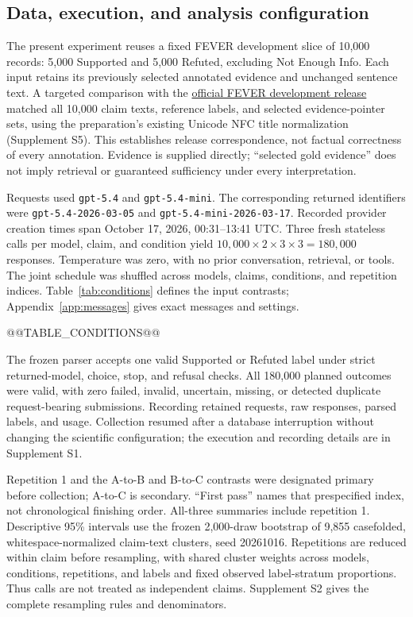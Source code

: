 \documentclass[11pt,letterpaper]{article}
\begin{document}
\subsection{Data, execution, and analysis configuration}\label{sec:setup}
The present experiment reuses a fixed FEVER development slice of 10,000 records: 5,000 Supported and 5,000 Refuted, excluding Not Enough Info. Each input retains its previously selected annotated evidence and unchanged sentence text. A targeted comparison with the \href{https://fever.ai/download/fever/shared_task_dev.jsonl}{official FEVER development release} matched all 10,000 claim texts, reference labels, and selected evidence-pointer sets, using the preparation's existing Unicode NFC title normalization (Supplement S5). This establishes release correspondence, not factual correctness of every annotation. Evidence is supplied directly; ``selected gold evidence'' does not imply retrieval or guaranteed sufficiency under every interpretation.

Requests used \texttt{gpt-5.4} and \texttt{gpt-5.4-mini}. The corresponding returned identifiers were \texttt{gpt-\allowbreak{}5.4-\allowbreak{}2026-\allowbreak{}03-\allowbreak{}05} and \texttt{gpt-\allowbreak{}5.4-\allowbreak{}mini-\allowbreak{}2026-\allowbreak{}03-\allowbreak{}17}. Recorded provider creation times span October 17, 2026, 00:31--13:41 UTC. Three fresh stateless calls per model, claim, and condition yield $10{,}000\times2\times3\times3=180{,}000$ responses. Temperature was zero, with no prior conversation, retrieval, or tools. The joint schedule was shuffled across models, claims, conditions, and repetition indices. Table~\ref{tab:conditions} defines the input contrasts; Appendix~\ref{app:messages} gives exact messages and settings.

@@TABLE_CONDITIONS@@

The frozen parser accepts one valid Supported or Refuted label under strict returned-model, choice, stop, and refusal checks. All 180,000 planned outcomes were valid, with zero failed, invalid, uncertain, missing, or detected duplicate request-bearing submissions. Recording retained requests, raw responses, parsed labels, and usage. Collection resumed after a database interruption without changing the scientific configuration; the execution and recording details are in Supplement S1.

Repetition 1 and the A-to-B and B-to-C contrasts were designated primary before collection; A-to-C is secondary. ``First pass'' names that prespecified index, not chronological finishing order. All-three summaries include repetition 1. Descriptive 95\% intervals use the frozen 2,000-draw bootstrap of 9,855 casefolded, whitespace-normalized claim-text clusters, seed 20261016. Repetitions are reduced within claim before resampling, with shared cluster weights across models, conditions, repetitions, and labels and fixed observed label-stratum proportions. Thus calls are not treated as independent claims. Supplement S2 gives the complete resampling rules and denominators.
\end{document}

